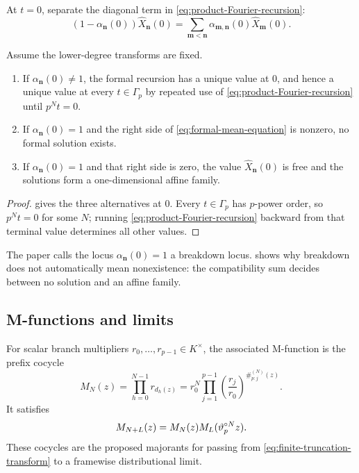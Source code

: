 At $t=0$, separate the diagonal term in
\cref{eq:product-Fourier-recursion}:
\begin{equation}
\label{eq:formal-mean-equation}
 (1-\alpha_{\mathbf n}(0))\widehat X_{\mathbf n}(0)
 =\sum_{\mathbf m<\mathbf n}
 \alpha_{\mathbf m,\mathbf n}(0)\widehat X_{\mathbf m}(0).
\end{equation}

\begin{proposition}
\label{prop:formal-compatibility}
Assume the lower-degree transforms are fixed.
\begin{enumerate}[label=\textup{(\roman*)}]
\item If $\alpha_{\mathbf n}(0)\ne1$, the formal recursion has a unique
      value at $0$, and hence a unique value at every $t\in\Gamma_p$ by
      repeated use of \cref{eq:product-Fourier-recursion} until $p^Nt=0$.
\item If $\alpha_{\mathbf n}(0)=1$ and the right side of
      \cref{eq:formal-mean-equation} is nonzero, no formal solution exists.
\item If $\alpha_{\mathbf n}(0)=1$ and that right side is zero, the value
      $\widehat X_{\mathbf n}(0)$ is free and the solutions form a
      one-dimensional affine family.
\end{enumerate}
\end{proposition}

\begin{proof}
 gives the three alternatives at
$0$.  Every $t\in\Gamma_p$ has $p$-power order, so $p^Nt=0$ for some $N$;
running \cref{eq:product-Fourier-recursion} backward from that terminal value
determines all other values.
\end{proof}

The paper calls the locus $\alpha_{\mathbf n}(0)=1$ a breakdown locus.
 shows why breakdown does not automatically
mean nonexistence: the compatibility sum decides between no solution and an
affine family.

\subsection{M-functions and limits}

For scalar branch multipliers $r_0,\ldots,r_{p-1}\in K^\times$, the associated
M-function is the prefix cocycle
\begin{equation}
\label{eq:M-function}
 M_N(z)=\prod_{h=0}^{N-1}r_{d_h(z)}
 =r_0^N\prod_{j=1}^{p-1}\left(\frac{r_j}{r_0}\right)^{
 \#^{(N)}_{p:j}(z)}.
\end{equation}
It satisfies
\[
 M_{N+L}(z)=M_N(z)M_L(\vartheta_p^{\circ N}z).
\]
These cocycles are the proposed majorants for passing from
\cref{eq:finite-truncation-transform} to a framewise distributional limit.

